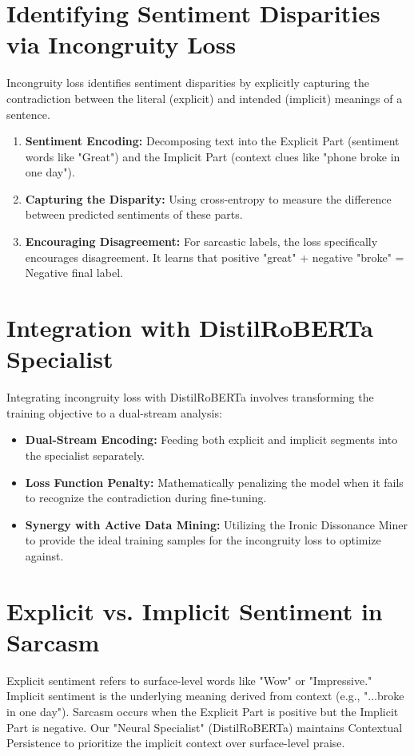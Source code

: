 \documentclass[11pt,oneside]{scrbook}
\begin{document}
\section{Identifying Sentiment Disparities via Incongruity Loss}
Incongruity loss identifies sentiment disparities by explicitly capturing the contradiction between the literal (explicit) and intended (implicit) meanings of a sentence.
\begin{enumerate}
    \item \textbf{Sentiment Encoding:} Decomposing text into the Explicit Part (sentiment words like "Great") and the Implicit Part (context clues like "phone broke in one day").
    \item \textbf{Capturing the Disparity:} Using cross-entropy to measure the difference between predicted sentiments of these parts.
    \item \textbf{Encouraging Disagreement:} For sarcastic labels, the loss specifically encourages disagreement. It learns that positive "great" + negative "broke" = Negative final label.
\end{enumerate}

\section{Integration with DistilRoBERTa Specialist}
Integrating incongruity loss with DistilRoBERTa involves transforming the training objective to a dual-stream analysis:
\begin{itemize}
    \item \textbf{Dual-Stream Encoding:} Feeding both explicit and implicit segments into the specialist separately.
    \item \textbf{Loss Function Penalty:} Mathematically penalizing the model when it fails to recognize the contradiction during fine-tuning.
    \item \textbf{Synergy with Active Data Mining:} Utilizing the Ironic Dissonance Miner to provide the ideal training samples for the incongruity loss to optimize against.
\end{itemize}

\section{Explicit vs. Implicit Sentiment in Sarcasm}
Explicit sentiment refers to surface-level words like "Wow" or "Impressive." Implicit sentiment is the underlying meaning derived from context (e.g., "...broke in one day"). Sarcasm occurs when the Explicit Part is positive but the Implicit Part is negative. Our "Neural Specialist" (DistilRoBERTa) maintains Contextual Persistence to prioritize the implicit context over surface-level praise.
\end{document}
